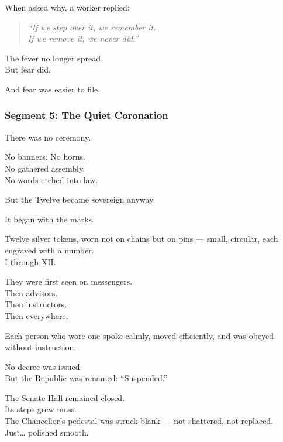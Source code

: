 \documentclass[9pt]{article}
\begin{document}
When asked why, a worker replied:

\begin{quote}
\textit{“If we step over it, we remember it.}\\
\textit{If we remove it, we never did.”}
\end{quote}

\vspace{1em}

The fever no longer spread.\\
But fear did.

And fear was easier to file.

\newpage

\subsubsection*{Segment 5: The Quiet Coronation}

There was no ceremony.

No banners. No horns.\\
No gathered assembly.\\
No words etched into law.

But the Twelve became sovereign anyway.

\vspace{1em}

It began with the marks.

Twelve silver tokens, worn not on chains but on pins — small, circular, each engraved with a number.\\
I through XII.

They were first seen on messengers.\\
Then advisors.\\
Then instructors.\\
Then everywhere.

Each person who wore one spoke calmly, moved efficiently, and was obeyed without instruction.

\vspace{1em}

No decree was issued.\\
But the Republic was renamed: “Suspended.”

The Senate Hall remained closed.\\
Its steps grew moss.\\
The Chancellor’s pedestal was struck blank — not shattered, not replaced.\\
Just… polished smooth.

\vspace{1em}
\end{document}

